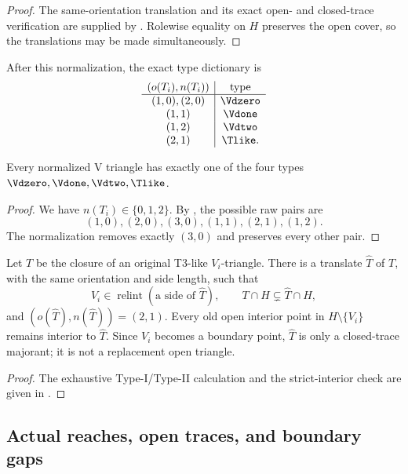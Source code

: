 \begin{proof}
The same-orientation translation and its exact open- and closed-trace
verification are supplied by .
Rolewise equality on $H$ preserves the open cover, so the translations may
be made simultaneously.
\end{proof}

After this normalization, the exact type dictionary is
\[
 \begin{array}{c|c}
 (o(T_i),n(T_i))&\text{type}\\ \hline
 (1,0),(2,0)&\Vdzero\\
 (1,1)&\Vdone\\
 (1,2)&\Vdtwo\\
 (2,1)&\Tlike.
 \end{array}
\]

\begin{proposition}
\label{prop:vertex-classification}
Every normalized V triangle has exactly one of the four types
$\Vdzero,\Vdone,\Vdtwo,\Tlike$.
\end{proposition}

\begin{proof}
We have $n(T_i)\in\{0,1,2\}$.  By , the possible
raw pairs are
\[
 (1,0),(2,0),(3,0),(1,1),(2,1),(1,2).
\]
The normalization removes exactly $(3,0)$ and preserves every other pair.
\end{proof}

\begin{proposition}
\label{prop:t3-translation}
Let $T$ be the closure of an original T3-like $V_i$-triangle.  There is a
translate $\widehat T$ of $T$, with the same orientation and side length,
such that
\[
 V_i\in\operatorname{relint}(\text{a side of }\widehat T),
 \qquad
 T\cap H\subsetneq\widehat T\cap H,
\]
and $(o(\widehat T),n(\widehat T))=(2,1)$.  Every old open interior point in
$H\setminus\{V_i\}$ remains interior to $\widehat T$.  Since $V_i$ becomes
a boundary point, $\widehat T$ is only a closed-trace majorant; it is not a
replacement open triangle.
\end{proposition}

\begin{proof}
The exhaustive Type-I/Type-II calculation and the strict-interior check are
given in .
\end{proof}

\subsection{Actual reaches, open traces, and boundary gaps}

